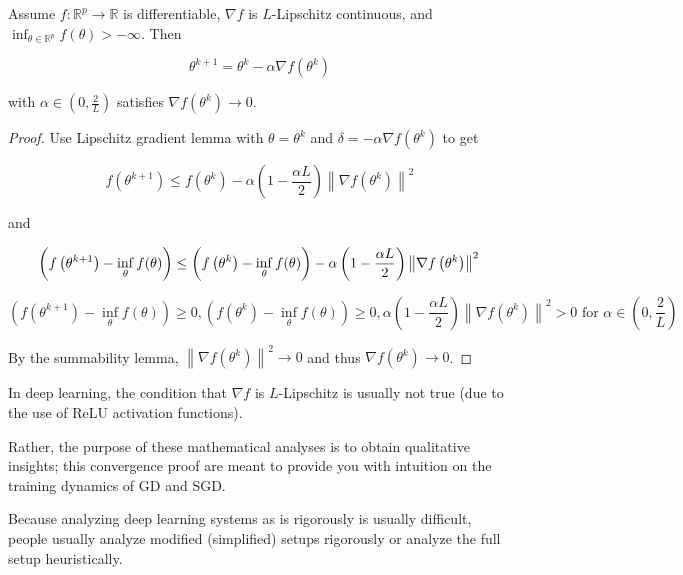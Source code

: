 \begin{theorem}[2.6][Convergence of GD]
    Assume $f: \mathbb{R}^{p} \rightarrow \mathbb{R}$ is differentiable, $\nabla f$ is $L$-Lipschitz continuous, and $\inf _{\theta \in \mathbb{R}^{p}} f(\theta)>-\infty$. Then

    $$
    \theta^{k+1}=\theta^{k}-\alpha \nabla f\left(\theta^{k}\right)
    $$

    with $\alpha \in\left(0, \frac{2}{L}\right)$ satisfies $\nabla f\left(\theta^{k}\right) \rightarrow 0$.

    \begin{proof}
        Use Lipschitz gradient lemma with $\theta=\theta^{k}$ and $\delta=-\alpha \nabla f\left(\theta^{k}\right)$ to get

        $$
        f\left(\theta^{k+1}\right) \leq f\left(\theta^{k}\right)-\alpha\left(1-\frac{\alpha L}{2}\right)\left\|\nabla f\left(\theta^{k}\right)\right\|^{2}
        $$

        and

        $$
        \left(f\left(\theta^{k+1}\right)-\inf _{\theta} f(\theta)\right) \leq\left(f\left(\theta^{k}\right)-\inf _{\theta} f(\theta)\right)-\alpha\left(1-\frac{\alpha L}{2}\right)\left\|\nabla f\left(\theta^{k}\right)\right\|^{2} \\
        $$

        $$
        \left(f\left(\theta^{k+1}\right)-\inf _{\theta} f(\theta)\right) \ge 0, 
        \left(f\left(\theta^{k}\right)-\inf _{\theta} f(\theta)\right) \ge 0, 
        \alpha\left(1-\frac{\alpha L}{2}\right)\left\|\nabla f\left(\theta^{k}\right)\right\|^{2} > 0 \text{ for } \alpha \in\left(0, \frac{2}{L}\right)
        $$

        By the summability lemma, $\left\|\nabla f\left(\theta^{k}\right)\right\|^{2} \rightarrow 0$ and thus $\nabla f\left(\theta^{k}\right) \rightarrow 0$.
    \end{proof}
\end{theorem}

In deep learning, the condition that $\nabla f$ is $L$-Lipschitz is usually not true (due to the use of ReLU activation functions).

Rather, the purpose of these mathematical analyses is to obtain qualitative insights; this convergence proof are meant to provide you with intuition on the training dynamics of GD and SGD.

Because analyzing deep learning systems as is rigorously is usually difficult, people usually analyze modified (simplified) setups rigorously or analyze the full setup heuristically.

